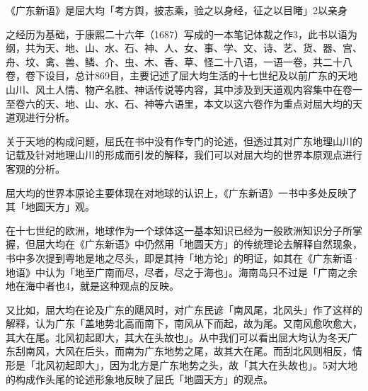 \begin{BookQuote}
《广东新语》是屈大均「考方舆，披志乘，验之以身经，征之以目睹」2以亲身
\end{BookQuote}

之经历为基础，于康熙二十六年（1687）写成的一本笔记体裁之作3，此书以语为纲，共为天、地、山、水、石、神、人、女、事、学、文、诗、艺、货、器、宫、舟、坟、禽、兽、鳞、介、虫、木、香、草、怪二十八语，一语一卷，共二十八卷，卷下设目，总计869目，主要记述了屈大均生活的十七世纪及以前广东的天地山川、风土人情、物产名胜、神话传说等内容，其中涉及到天道观内容集中在卷一至卷六的天、地、山、水、石、神等六语里，本文以这六卷作为重点对屈大均的天道观进行分析。

\vfill
\begin{BookNotes}
\end{BookNotes}



关于天地的构成问题，屈氏在书中没有作专门的论述，但透过其对广东地理山川的记载及针对地理山川的形成而引发的解释，我们可以对屈大均的世界本原观点进行客观的分析。

屈大均的世界本原论主要体现在对地球的认识上，《广东新语》一书中多处反映了其「地圆天方」观。

在十七世纪的欧洲，地球作为一个球体这一基本知识已经为一般欧洲知识分子所掌握，但屈大均在《广东新语》中仍然用「地圆天方」的传统理论去解释自然现象，书中多次提到粤地是地之尽头，即是其持「地方论」的明证，如其在《广东新语·地语》中认为「地至广南而尽，尽者，尽之于海也」。海南岛只不过是「广南之余地在海中者也4，就是这种观点的反映。

又比如，屈大均在论及广东的飓风时，对广东民谚「南风尾，北风头」作了这样的解释，认为广东「盖地势北高而南下，南风从下而起，故为尾。又南风愈吹愈大，其大在尾。北风初起即大，其大在头故也」。从中我们可以看出屈大均认为冬天广东刮南风，大风在后头，而南为广东地势之尾，故其大在尾。而刮北风则相反，情形是「北风初起即大」，因为北方是广东地势之头，故「其大在头故也」。5对大地的构成作头尾的论述形象地反映了屈氏「地圆天方」的观点。


